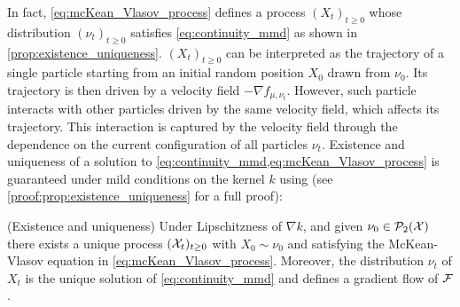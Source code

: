 In fact,  \cref{eq:mcKean_Vlasov_process} defines a process $(X_t)_{t\geq 0}$ whose distribution $(\nu_t)_{t\geq 0}$ satisfies \cref{eq:continuity_mmd} as shown in \cref{prop:existence_uniqueness}. 
$(X_t)_{t\geq 0}$ can be interpreted as  the trajectory of a single particle starting from an initial random position $X_0$ drawn from $\nu_0$. Its trajectory is then driven by a velocity field $-\nabla f_{\mu,\nu_t}$. However, such particle interacts with other particles driven by the same velocity field, which affects its trajectory. This interaction is captured by the velocity field through the dependence on the current configuration of all particles $\nu_t$.
Existence and uniqueness of a solution to \cref{eq:continuity_mmd,eq:mcKean_Vlasov_process} is guaranteed under mild conditions on the kernel $k$ using \cite[Proposition 2.5]{chizat2018global} (see \cref{proof:prop:existence_uniqueness} for a full proof):
\begin{proposition}\label{prop:existence_uniqueness}(Existence and uniqueness)
	Under Lipschitzness of $\nabla k$, and given $\nu_0\in \mathcal{P}_2({{\mathcal X}})$ there exists a unique process $({{\mathcal X}}_t)_{t\geq 0}$ with $X_0\sim \nu_0$ and satisfying the McKean-Vlasov equation in \cref{eq:mcKean_Vlasov_process}. Moreover, the distribution $\nu_t$ of $X_t$ is the unique solution of \cref{eq:continuity_mmd} and defines a gradient flow of ${{\mathcal F}}$. 
\end{proposition}
